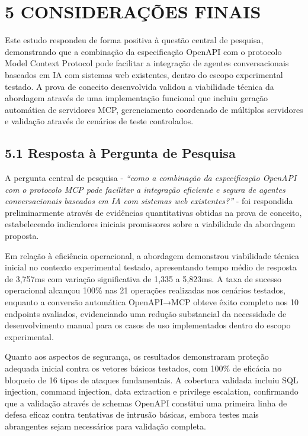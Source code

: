 \documentclass[
]{article}
\begin{document}
\section{5 CONSIDERAÇÕES FINAIS}\label{considerauxe7uxf5es-finais}

Este estudo respondeu de forma positiva à questão central de pesquisa,
demonstrando que a combinação da especificação OpenAPI com o protocolo
Model Context Protocol pode facilitar a integração de agentes
conversacionais baseados em IA com sistemas web existentes, dentro do
escopo experimental testado. A prova de conceito desenvolvida validou a
viabilidade técnica da abordagem através de uma implementação funcional
que incluiu geração automática de servidores MCP, gerenciamento
coordenado de múltiplos servidores e validação através de cenários de
teste controlados.

\subsection{5.1 Resposta à Pergunta de
Pesquisa}\label{resposta-uxe0-pergunta-de-pesquisa}

A pergunta central de pesquisa - \emph{``como a combinação da
especificação OpenAPI com o protocolo MCP pode facilitar a integração
eficiente e segura de agentes conversacionais baseados em IA com
sistemas web existentes?''} - foi respondida preliminarmente através de
evidências quantitativas obtidas na prova de conceito, estabelecendo
indicadores iniciais promissores sobre a viabilidade da abordagem
proposta.

Em relação à eficiência operacional, a abordagem demonstrou viabilidade
técnica inicial no contexto experimental testado, apresentando tempo
médio de resposta de 3,757ms com variação significativa de 1,335 a
5,823ms. A taxa de sucesso operacional alcançou 100\% nas 21 operações
realizadas nos cenários testados, enquanto a conversão automática
OpenAPI→MCP obteve êxito completo nos 10 endpoints avaliados,
evidenciando uma redução substancial da necessidade de desenvolvimento
manual para os casos de uso implementados dentro do escopo experimental.

Quanto aos aspectos de segurança, os resultados demonstraram proteção
adequada inicial contra os vetores básicos testados, com 100\% de
eficácia no bloqueio de 16 tipos de ataques fundamentais. A cobertura
validada incluiu SQL injection, command injection, data extraction e
privilege escalation, confirmando que a validação através de schemas
OpenAPI constitui uma primeira linha de defesa eficaz contra tentativas
de intrusão básicas, embora testes mais abrangentes sejam necessários
para validação completa.
\end{document}
